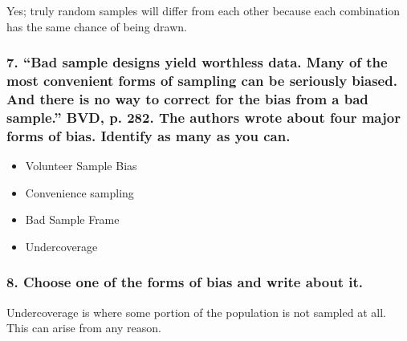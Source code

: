 \documentclass[letterpaper]{article}
\def\tightlist{}
\begin{document}
Yes; truly random samples will differ from each other because each combination has the same chance of being drawn.

\subsubsection{7. ``Bad sample designs yield worthless data. Many of the most convenient forms of sampling can be seriously biased. And there is no way to correct for the bias from a bad sample.'' BVD, p. 282. The authors wrote about four major forms of bias. Identify as many as you can.}\label{bad-sample-designs-yield-worthless-data.-many-of-the-most-convenient-forms-of-sampling-can-be-seriously-biased.-and-there-is-no-way-to-correct-for-the-bias-from-a-bad-sample.-bvd-p.-282.-the-authors-wrote-about-four-major-forms-of-bias.-identify-as-many-as-you-can.}

\begin{itemize}
\tightlist
\item
  Volunteer Sample Bias
\item
  Convenience sampling
\item
  Bad Sample Frame
\item
  Undercoverage
\end{itemize}

\subsubsection{8. Choose one of the forms of bias and write about it.}\label{choose-one-of-the-forms-of-bias-and-write-about-it.}

Undercoverage is where some portion of the population is not sampled at all. This can arise from any reason.
\end{document}
